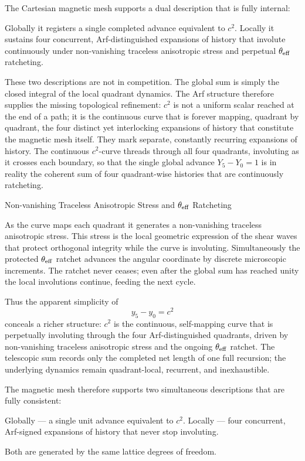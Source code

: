 The Cartesian magnetic mesh supports a dual description that is fully internal:

Globally it registers a single completed advance equivalent to \(c^2\).  
Locally it sustains four concurrent, Arf-distinguished expansions of history that involute continuously under non-vanishing traceless anisotropic stress and perpetual \(\theta_{\rm eff}\) ratcheting.

These two descriptions are not in competition. The global sum is simply the closed integral of the local quadrant dynamics. The Arf structure therefore supplies the missing topological refinement: \(c^2\) is not a uniform scalar reached at the end of a path; it is the continuous curve that is forever mapping, quadrant by quadrant, the four distinct yet interlocking expansions of history that constitute the magnetic mesh itself.
They mark separate, constantly recurring expansions of history. The continuous \(c^2\)-curve threads through all four quadrants, involuting as it crosses each boundary, so that the single global advance \(Y_5-Y_0=1\) is in reality the coherent sum of four quadrant-wise histories that are continuously ratcheting.

Non-vanishing Traceless Anisotropic Stress and \(\theta_{\rm eff}\) Ratcheting

As the curve maps each quadrant it generates a non-vanishing traceless anisotropic stress. This stress is the local geometric expression of the shear waves that protect orthogonal integrity while the curve is involuting. Simultaneously the protected \(\theta_{\rm eff}\) ratchet advances the angular coordinate by discrete microscopic increments. The ratchet never ceases; even after the global sum has reached unity the local involutions continue, feeding the next cycle.

Thus the apparent simplicity of  
\[
y_5 - y_0 = c^2
\]  
conceals a richer structure: \(c^2\) is the continuous, self-mapping curve that is perpetually involuting through the four Arf-distinguished quadrants, driven by non-vanishing traceless anisotropic stress and the ongoing \(\theta_{\rm eff}\) ratchet. The telescopic sum records only the completed net length of one full recursion; the underlying dynamics remain quadrant-local, recurrent, and inexhaustible.

The magnetic mesh therefore supports two simultaneous descriptions that are fully consistent:

Globally — a single unit advance equivalent to \(c^2\).  
Locally — four concurrent, Arf-signed expansions of history that never stop involuting.

Both are generated by the same lattice degrees of freedom.

